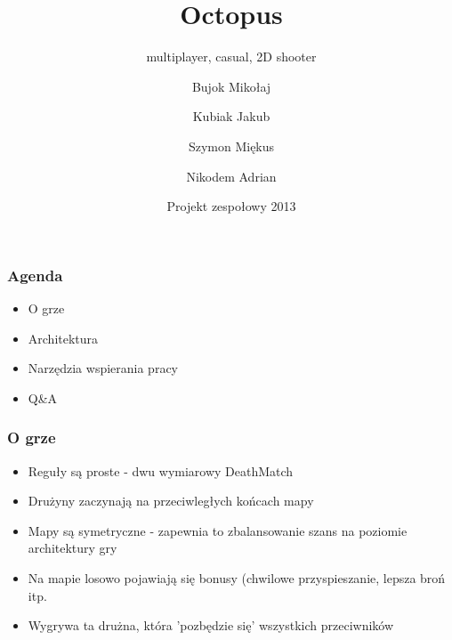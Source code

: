 \documentclass{beamer}
\title
{Octopus}
\subtitle{multiplayer, casual, 2D shooter}
\author[]
{Bujok Mikołaj \and Kubiak Jakub \\ \and Szymon Miękus\and Nikodem Adrian}
\date[\today]
{Projekt zespołowy 2013}
\begin{document}
\frame{\titlepage}
\begin{frame}
  \frametitle{Agenda}
  \begin{itemize}
  \item O grze
  \item Architektura
  \item Narzędzia wspierania pracy
  \item Q\&A
  \end{itemize}
\end{frame}

\begin{frame}
  \frametitle{O grze}
  \begin{itemize}
    \item Reguły są proste - dwu wymiarowy DeathMatch
    \item Drużyny zaczynają na przeciwległych końcach mapy
    \item Mapy są symetryczne - zapewnia to zbalansowanie
          szans na poziomie architektury gry
    \item Na mapie losowo pojawiają się bonusy (chwilowe przyspieszanie, lepsza broń itp.
    \item Wygrywa ta drużna, która 'pozbędzie się' wszystkich przeciwników
  \end{itemize}
\end{frame}
\end{document}
